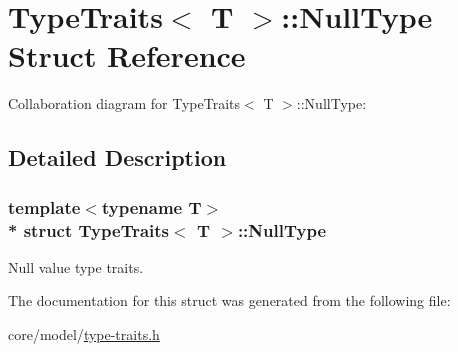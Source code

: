 \hypertarget{structTypeTraits_1_1NullType}{}\section{Type\+Traits$<$ T $>$\+:\+:Null\+Type Struct Reference}
\label{structTypeTraits_1_1NullType}


Collaboration diagram for Type\+Traits$<$ T $>$\+:\+:Null\+Type\+:


\subsection{Detailed Description}
\subsubsection*{template$<$typename T$>$\\*
struct Type\+Traits$<$ T $>$\+::\+Null\+Type}

Null value type traits. 

The documentation for this struct was generated from the following file\+:\begin{DoxyCompactItemize}
\item 
core/model/\hyperlink{type-traits_8h}{type-\/traits.\+h}\end{DoxyCompactItemize}
